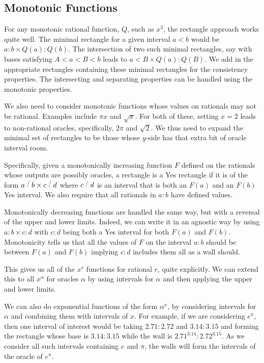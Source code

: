 \documentclass[12pt]{article}
\begin{document}
\subsection{Monotonic Functions}

For any monotonic rational function, $Q$, such as $x^3$, the rectangle approach works quite well. The minimal rectangle for a given interval $a \lt b$ would be $a:b \times Q(a):Q(b)$. The intersection of two such minimal rectangles, say with bases satisfying $A \lt a \lt B \lt b$ leads to $a \lt B  \times  Q(a):Q(B) $. We add in the appropriate rectangles containing these minimal rectangles for the consistency properties. The intersecting and separating properties can be handled using the monotonic properties. 

We also need to consider monotonic functions whose values on rationals may not be rational. Examples include $\pi x$ and $\sqrt{x}$. For both of these, setting $x=2$ leads to non-rational oracles, specifically, $2 \pi$ and $\sqrt{2}$. We thus need to expand the minimal set of rectangles to be those whose $y$-side has that extra bit of oracle interval room. 

Specifically, given a monotonically increasing function $F$ defined on the rationals whose outputs are possibly oracles, a rectangle is a Yes rectangle if it is of the form  $a \lte b \times c\lte d$  where $c \lte d$ is an interval that is both an $F(a)$ and an $F(b)$ Yes interval.  We also require that all rationals in $a:b$ have defined values. 

Monotonically decreasing functions are handled the same way, but with a reversal of the upper and lower limits. Indeed, we can write it in an agnostic way by using $a:b \times c:d$ with $c:d$ being both a Yes interval for both $F(a)$ and $F(b)$. Monotonicity tells us that all the values of $F$ on the interval $a:b$ should be between $F(a)$ and $F(b)$ implying $c:d$ includes them all as a wall should. 

This gives us all of the $x^r$ functions for rational $r$, quite explicitly. We can extend this to all $x^{\alpha}$ for oracles $\alpha$ by using intervals for $\alpha$ and then applying the upper and lower limits. 

We can also do exponential functions of the form $\alpha^{x}$, by considering intervals for $\alpha$ and combining them with intervals of $x$. For example, if we are considering $e^{\pi}$, then one interval of interest would be taking $2.71:2.72$ and $3.14:3.15$ and forming the rectangle whose base is $3.14:3.15$ while the wall is $2.71^{3.14}:2.72^{3.15}$. As we consider all such intervals containing $e$ and $\pi$, the walls will form the intervals of the oracle of $e^{\pi}$.
\end{document}
